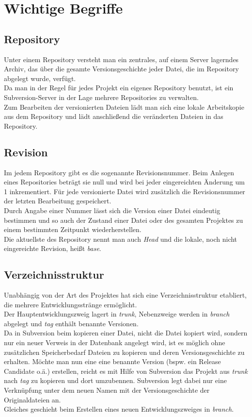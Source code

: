\section{Wichtige Begriffe}
\subsection{Repository}
Unter einem Repository versteht man ein zentrales, auf einem Server lagerndes Archiv, das über die gesamte Versionsgeschichte jeder Datei, die im Repository abgelegt wurde, verfügt.\\
Da man in der Regel für jedes Projekt ein eigenes Repository benutzt, ist ein Subversion-Server in der Lage mehrere Repositories zu verwalten.\\
Zum Bearbeiten der versionierten Dateien lädt man sich eine lokale Arbeitskopie aus dem Repository und lädt anschließend die veränderten Dateien in das Repository.
\subsection{Revision}
Im jedem Repository gibt es die sogenannte Revisionsnummer. Beim Anlegen eines Repositories beträgt sie null und wird bei jeder eingereichten Änderung um 1 inkrementiert. Für jede versionierte Datei wird zusätzlich die Revisionsnummer der letzten Bearbeitung gespeichert.\\
Durch Angabe einer Nummer lässt sich die Version einer Datei eindeutig bestimmen und so auch der Zustand einer Datei oder des gesamten Projektes zu einem bestimmten Zeitpunkt wiederherstellen.\\
Die aktuellste des Repository nennt man auch \emph{Head} und die lokale, noch nicht eingereichte Revision, heißt \emph{base}.
\subsection{Verzeichnisstruktur}
Unabhängig von der Art des Projektes hat sich eine Verzeichnisstruktur etabliert, die mehrere Entwicklungsstränge ermöglicht.\\
Der Hauptentwicklungszweig lagert in \emph{trunk}, Nebenzweige werden in \emph{branch} abgelegt und \emph{tag} enthält benannte Versionen.\\
Da in Subversion beim kopieren einer Datei, nicht die Datei kopiert wird, sondern nur ein neuer Verweis in der Datenbank angelegt wird, ist es möglich ohne zusätzlichen Speicherbedarf Dateien zu kopieren und deren Versionsgeschichte zu erhalten. Möchte man nun eine eine benannte Version (bspw. ein Release Candidate o.ä.) erstellen, reicht es mit Hilfe von Subversion das Projekt aus \emph{trunk} nach \emph{tag} zu kopieren und dort umzubennen. Subversion legt dabei nur eine Verknüpfung unter dem neuen Namen mit der Versionsgeschichte der Originaldateien an.\\
Gleiches geschieht beim Erstellen eines neuen Entwicklungszweiges in \emph{branch}.

